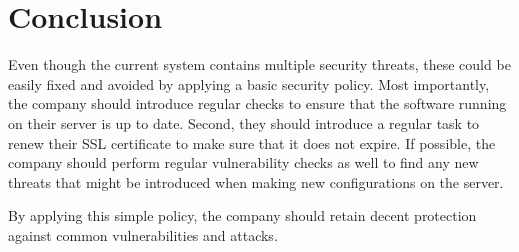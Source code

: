 \section{Conclusion} \label{sec:conclusion}

Even though the current system contains multiple security threats, these could be easily fixed and avoided by applying a basic security policy.
Most importantly, the company should introduce regular checks to ensure that the software running on their server is up to date.
Second, they should introduce a regular task to renew their SSL certificate to make sure that it does not expire.
If possible, the company should perform regular vulnerability checks as well to find any new threats that might be introduced when making new configurations on the server.

By applying this simple policy, the company should retain decent protection against common vulnerabilities and attacks.